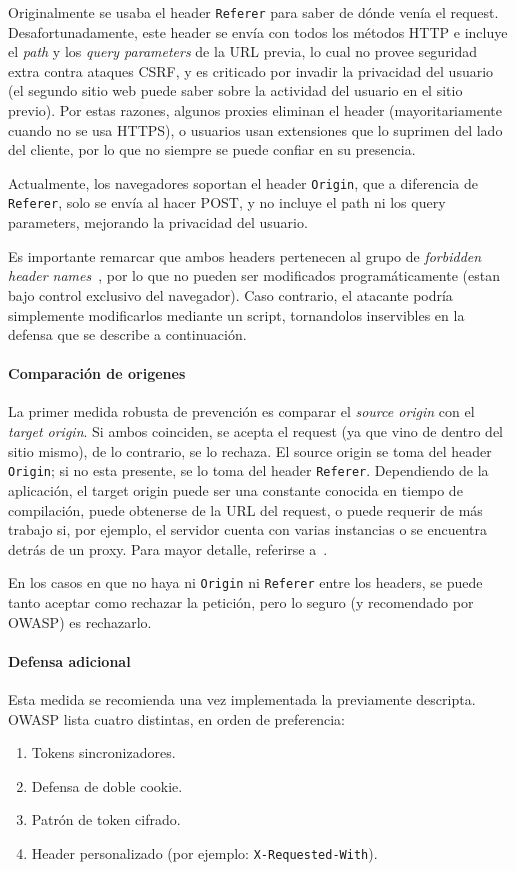 \documentclass{article}
\theoremstyle{definition}
\begin{document}
Originalmente se usaba el header \texttt{Referer} para saber de dónde venía el
request. Desafortunadamente, este header se envía con todos los métodos HTTP e
incluye el \textit{path} y los \textit{query parameters} de la URL previa, lo
cual no provee seguridad extra contra ataques CSRF, y es criticado por invadir la privacidad
del usuario (el segundo sitio web puede saber sobre la actividad del usuario
en el sitio previo). Por estas razones, algunos proxies eliminan el header
(mayoritariamente cuando no se usa HTTPS), o usuarios usan extensiones que lo
suprimen del lado del cliente, por lo que no siempre se puede confiar en su
presencia.

Actualmente, los navegadores soportan el header \texttt{Origin}, que a
diferencia de \texttt{Referer}, solo se envía al hacer POST, y no incluye el
path ni los query parameters, mejorando la privacidad del usuario.

Es importante remarcar que ambos headers pertenecen al grupo de
\textit{forbidden header names}~\cite{fetch}, por lo que no pueden ser modificados
programáticamente (estan bajo control exclusivo del navegador). Caso
contrario, el atacante podría simplemente modificarlos mediante un script,
tornandolos inservibles en la defensa que se describe a continuación.

\paragraph{Comparación de origenes} La primer medida robusta de
prevención es comparar el \textit{source origin} con el \textit{target origin}.
Si ambos coinciden, se acepta el request (ya que vino de dentro del
sitio mismo), de lo contrario, se lo rechaza.
El source origin se toma del header \verb+Origin+; si no esta presente, se lo
toma del header \verb+Referer+.
Dependiendo de la aplicación, el target origin puede ser una constante conocida
en tiempo de compilación, puede obtenerse de la URL del request, o puede
requerir de más trabajo si, por ejemplo, el servidor cuenta con varias
instancias o se encuentra detrás de un proxy. Para mayor detalle, referirse a~\cite{owasp}.

En los casos en que no haya ni \verb+Origin+ ni \verb+Referer+ entre los
headers, se puede tanto aceptar como rechazar la petición, pero lo seguro (y
recomendado por OWASP) es rechazarlo.

\paragraph{Defensa adicional} Esta medida se recomienda una vez implementada la
previamente descripta. OWASP lista cuatro distintas, en orden de preferencia:
\begin{enumerate}
  \itemsep 0pt
  \item Tokens sincronizadores.
  \item Defensa de doble cookie.
  \item Patrón de token cifrado.
  \item Header personalizado (por ejemplo: \texttt{X-Requested-With}).
\end{enumerate}
\end{document}
